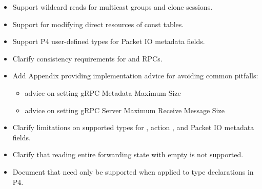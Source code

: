 \documentclass[11pt]{article}
\begin{document}
{\begin{itemize}[noitemsep,topsep=\mdcompacttopsep]
\item{}Support wildcard reads for multicast groups and clone sessions.%

\item{}Support for modifying direct resources of const tables.%

\item{}Support P4 user-defined types for Packet IO metadata fields.%

\item{}Clarify consistency requirements for  and  RPCs.%

\item{}Add Appendix providing implementation advice for avoiding common pitfalls:

\begin{itemize}[noitemsep,topsep=\mdcompacttopsep]%

\item{}advice on setting gRPC Metadata Maximum Size%

\item{}advice on setting gRPC Server Maximum Receive Message Size%
\end{itemize}%

\item{}Clarify limitations on supported types for , action , and
Packet IO metadata fields.%

\item{}Clarify that reading entire forwarding state with empty  is not
supported.%

\item{}Document that  need only be supported when applied to
type declarations in P4.%
\end{itemize}%

}
\end{document}
